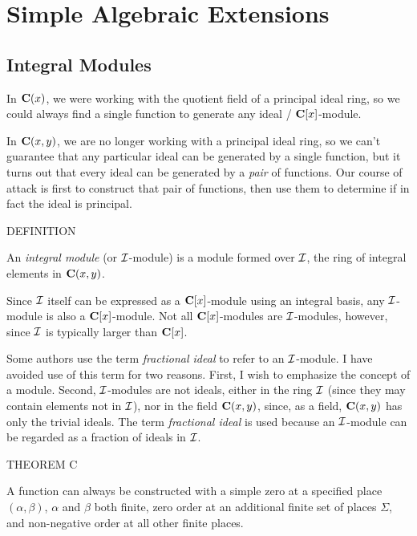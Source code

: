 
\setcounter{chapter}{8}
\chapter{Simple Algebraic Extensions}



\section{Integral Modules}

In ${\bf C}(x)$, we were working with the quotient field of a
principal ideal ring, so we could always find a single function to
generate any ideal / ${\bf C}[x]$-module.

In ${\bf C}(x,y)$, we are no longer working with a principal ideal
ring, so we can't guarantee that any particular ideal can be generated
by a single function, but it turns out that every ideal can be
generated by a {\it pair} of functions.  Our course of attack is first
to construct that pair of functions, then use them to determine if in
fact the ideal is principal.

DEFINITION

An {\it integral module} (or ${\cal I}$-module) is a module formed
over ${\cal I}$, the ring of integral elements in ${\bf C}(x,y)$.

Since ${\cal I}$ itself can be expressed as a ${\bf C}[x]$-module
using an integral basis, any ${\cal I}$-module is also a ${\bf
C}[x]$-module.  Not all ${\bf C}[x]$-modules are ${\cal I}$-modules,
however, since ${\cal I}$ is typically larger than ${\bf C}[x]$.

Some authors use the term {\it fractional ideal} to refer to an ${\cal
I}$-module.  I have avoided use of this term for two reasons.  First,
I wish to emphasize the concept of a module.  Second, ${\cal
I}$-modules are not ideals, either in the ring ${\cal I}$ (since they
may contain elements not in ${\cal I}$), nor in the field ${\bf
C}(x,y)$, since, as a field, ${\bf C}(x,y)$ has only the trivial
ideals.  The term {\it fractional ideal} is used because an ${\cal
I}$-module can be regarded as a fraction of ideals in ${\cal I}$.

THEOREM C

A function can always be constructed with a simple zero at a specified
place $(\alpha, \beta)$, $\alpha$ and $\beta$ both finite, zero order
at an additional finite set of places $\Sigma$, and non-negative order
at all other finite places.

